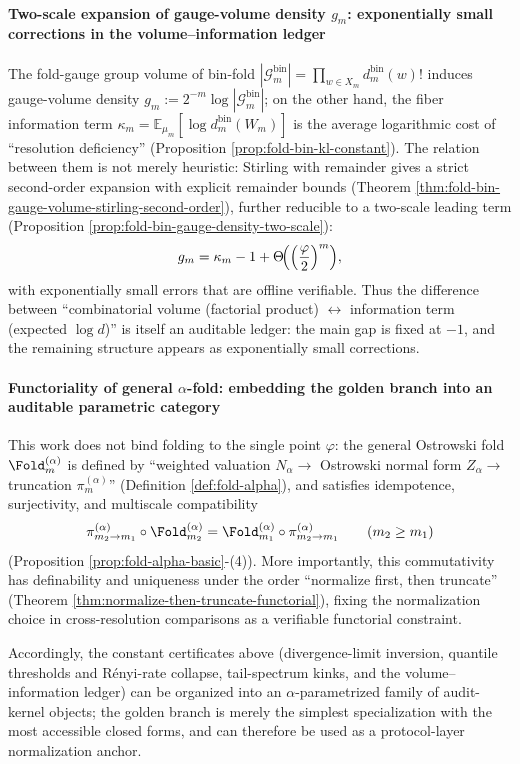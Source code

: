\paragraph{Two-scale expansion of gauge-volume density \texorpdfstring{$g_m$}{gm}: exponentially small corrections in the volume--information ledger}
The fold-gauge group volume of bin-fold
\(
|\mathcal{G}^{\mathrm{bin}}_m|=\prod_{w\in X_m}d_m^{\mathrm{bin}}(w)!
\)
induces gauge-volume density \(g_m:=2^{-m}\log|\mathcal{G}^{\mathrm{bin}}_m|\);
on the other hand, the fiber information term
\(
\kappa_m=\mathbb{E}_{\mu_m}[\log d_m^{\mathrm{bin}}(W_m)]
\)
is the average logarithmic cost of ``resolution deficiency'' (Proposition \ref{prop:fold-bin-kl-constant}).
The relation between them is not merely heuristic: Stirling with remainder gives a strict second-order expansion with explicit remainder bounds (Theorem \ref{thm:fold-bin-gauge-volume-stirling-second-order}), further reducible to a two-scale leading term (Proposition \ref{prop:fold-bin-gauge-density-two-scale}):
\[
g_m=\kappa_m-1+\Theta\!\Bigl(\Bigl(\frac{\varphi}{2}\Bigr)^m\Bigr),
\]
with exponentially small errors that are offline verifiable.
Thus the difference between ``combinatorial volume (factorial product) \(\leftrightarrow\) information term (expected \(\log d\))'' is itself an auditable ledger: the main gap is fixed at \(-1\), and the remaining structure appears as exponentially small corrections.

\paragraph{Functoriality of general \texorpdfstring{$\alpha$}{alpha}-fold: embedding the golden branch into an auditable parametric category}
This work does not bind folding to the single point \(\varphi\): the general Ostrowski fold
\(\Fold_m^{(\alpha)}\)
is defined by ``weighted valuation \(N_\alpha\)\(\to\) Ostrowski normal form \(Z_\alpha\)\(\to\) truncation \(\pi_m^{(\alpha)}\)'' (Definition \ref{def:fold-alpha}), and satisfies idempotence, surjectivity, and multiscale compatibility
\[
\pi^{(\alpha)}_{m_2\to m_1}\circ \Fold^{(\alpha)}_{m_2}
=\Fold^{(\alpha)}_{m_1}\circ \pi^{(\alpha)}_{m_2\to m_1}
\qquad(m_2\ge m_1)
\]
(Proposition \ref{prop:fold-alpha-basic}-(4)).
More importantly, this commutativity has definability and uniqueness under the order ``normalize first, then truncate'' (Theorem \ref{thm:normalize-then-truncate-functorial}), fixing the normalization choice in cross-resolution comparisons as a verifiable functorial constraint.
\par
Accordingly, the constant certificates above (divergence-limit inversion, quantile thresholds and R\'enyi-rate collapse, tail-spectrum kinks, and the volume--information ledger) can be organized into an \(\alpha\)-parametrized family of audit-kernel objects; the golden branch is merely the simplest specialization with the most accessible closed forms, and can therefore be used as a protocol-layer normalization anchor.


